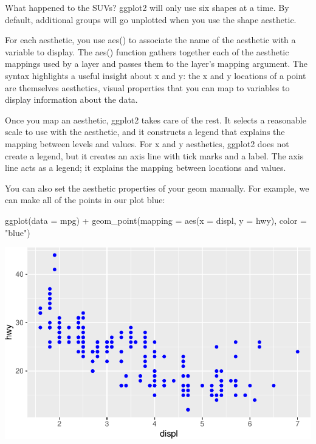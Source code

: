 \documentclass[
  letterpaper,
  DIV=11,
  numbers=noendperiod]{scrreprt}
\newenvironment{Shaded}{\begin{snugshade}}{\end{snugshade}}
\newcommand{\AttributeTok}[1]{\textcolor[rgb]{0.40,0.45,0.13}{#1}}
\newcommand{\FunctionTok}[1]{\textcolor[rgb]{0.28,0.35,0.67}{#1}}
\newcommand{\NormalTok}[1]{\textcolor[rgb]{0.00,0.23,0.31}{#1}}
\newcommand{\SpecialCharTok}[1]{\textcolor[rgb]{0.37,0.37,0.37}{#1}}
\newcommand{\StringTok}[1]{\textcolor[rgb]{0.13,0.47,0.30}{#1}}
\begin{document}
What happened to the SUVs? ggplot2 will only use six shapes at a time.
By default, additional groups will go unplotted when you use the shape
aesthetic.

For each aesthetic, you use aes() to associate the name of the aesthetic
with a variable to display. The aes() function gathers together each of
the aesthetic mappings used by a layer and passes them to the layer's
mapping argument. The syntax highlights a useful insight about x and y:
the x and y locations of a point are themselves aesthetics, visual
properties that you can map to variables to display information about
the data.

Once you map an aesthetic, ggplot2 takes care of the rest. It selects a
reasonable scale to use with the aesthetic, and it constructs a legend
that explains the mapping between levels and values. For x and y
aesthetics, ggplot2 does not create a legend, but it creates an axis
line with tick marks and a label. The axis line acts as a legend; it
explains the mapping between locations and values.

You can also set the aesthetic properties of your geom manually. For
example, we can make all of the points in our plot blue:

\begin{Shaded}
\begin{Highlighting}[]
\FunctionTok{ggplot}\NormalTok{(}\AttributeTok{data =}\NormalTok{ mpg) }\SpecialCharTok{+} 
  \FunctionTok{geom\_point}\NormalTok{(}\AttributeTok{mapping =} \FunctionTok{aes}\NormalTok{(}\AttributeTok{x =}\NormalTok{ displ, }\AttributeTok{y =}\NormalTok{ hwy), }\AttributeTok{color =} \StringTok{"blue"}\NormalTok{)}
\end{Highlighting}
\end{Shaded}

\includegraphics{Beginning_Data_Visualization_files/figure-pdf/Example 4-1.pdf}
\end{document}
